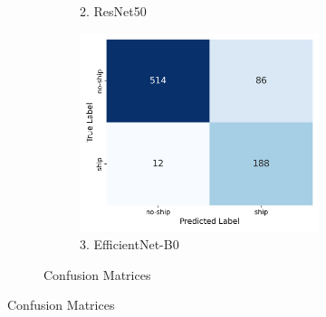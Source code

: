\documentclass[11pt]{article}
\begin{document}
\begin{figure}[H]
\begin{subfigure}[b]{\textwidth}
\begin{subfigure}[b]{0.32\textwidth}
				\caption*{2. ResNet50}
			\end{subfigure}
			\hfill
			\begin{subfigure}[b]{0.32\textwidth}
				\centering
				\captionsetup{labelformat=empty}
				\includegraphics[width=\textwidth]{assets/confusion_matrix/efficientnet_confusion_matrix.png}
				\caption*{3. EfficientNet-B0}
			\end{subfigure}
			\caption{Confusion Matrices}
		\end{subfigure}
		
	\end{figure}
	
\end{document}
